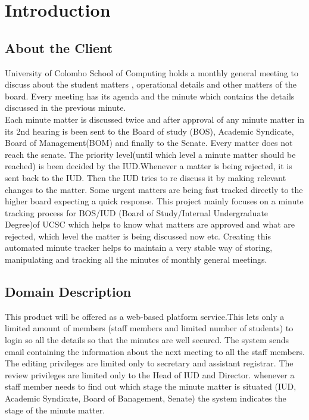\documentclass[a4paper,beamer]{article}
\begin{document}
	\renewcommand{\footrulewidth}{0.1pt}
	
	\tableofcontents
	\newpage
	
	\section{Introduction}
	
	\subsection{About the Client}
	
	University of Colombo School of Computing holds a monthly general meeting to  discuss about the student matters , operational details and other matters of the board. Every meeting has its agenda and the minute which contains the details discussed in the previous minute.\\
	
	Each minute matter is discussed twice and after  approval of any minute matter in its 2nd hearing  is been sent to the  Board of study (BOS), Academic Syndicate, Board of Management(BOM) and finally to the Senate. Every matter does not reach the senate. The priority level(until which level a minute matter should be reached) is been decided by the IUD.Whenever a matter is being rejected, it is sent back to the IUD. Then the IUD tries to re discuss it  by making relevant changes to the matter. Some urgent matters are being fast tracked directly to the higher board expecting a quick response. This project  mainly focuses  on a minute tracking process for BOS/IUD (Board of Study/Internal Undergraduate Degree)of UCSC which helps to know what matters are approved and what are rejected, which level the matter is being discussed now etc. Creating this automated minute tracker  helps to maintain a very stable way of storing, manipulating and tracking  all the minutes of monthly general meetings.
	
	\subsection{Domain Description}
	This product will be offered as a web-based platform service.This  lets only a limited amount of members (staff members and limited number of students) to login so all the details  so that the minutes are well secured. The system sends email containing the information about the next meeting to all the staff members. The editing privileges are limited only to secretary and assistant registrar. The review privileges are limited only to the Head of IUD and Director. whenever a staff member needs to find out which stage the minute matter is situated (IUD, Academic Syndicate, Board of Banagement, Senate) the system indicates the stage of the minute matter.\newline
	
\end{document}
